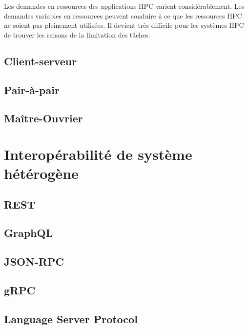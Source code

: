 Les demandes en ressources des applications HPC varient considérablement. Les demandes variables en ressources peuvent conduire à ce que les ressources HPC ne soient pas pleinement utilisées. Il devient très difficile pour les systèmes HPC de trouver les raisons de la limitation des tâches. \cite{li2023analyzing}

\subsection{Client-serveur}

\subsection{Pair-à-pair}

\subsection{Maître-Ouvrier}


\section{Interopérabilité de système hétérogène}

\subsection{REST}

\subsection{GraphQL}

\subsection{JSON-RPC}

\subsection{gRPC}

\subsection{Language Server Protocol}

